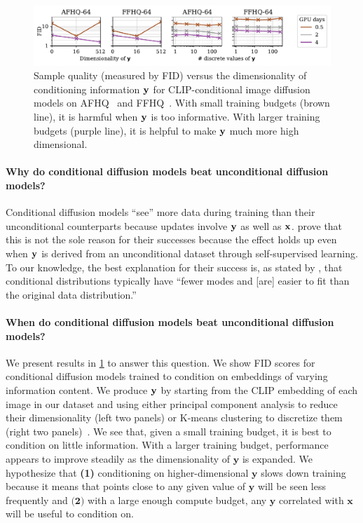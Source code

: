 \begin{figure}[t]
    \centering
    \includegraphics[width=\textwidth]{figs/2sdm/cond-results-vs-nclusters.pdf}
    \caption{Sample quality (measured by FID) versus the dimensionality of conditioning information ${\mathbf{y}}$ for CLIP-conditional image diffusion models on AFHQ~\citep{choi2020stargan} and FFHQ~\citep{karras2018style}. With small training budgets (brown line), it is harmful when ${\mathbf{y}}$ is too informative. With larger training budgets (purple line), it is helpful to make ${\mathbf{y}}$ much more high dimensional.}
    \label{fig:fid-vs-ncomp}
\end{figure}

\paragraph{Why do conditional diffusion models beat unconditional diffusion models?}

Conditional diffusion models ``see'' more data during training than their unconditional counterparts because updates involve ${\mathbf{y}}$ as well as ${\mathbf{x}}$. \citet{bao2022conditional,hu2022self} prove that this is not the sole reason for their successes because the effect holds up even when ${\mathbf{y}}$ is derived from an unconditional dataset through self-supervised learning.
%
To our knowledge, the best explanation for their success is, as stated by \citet{bao2022conditional}, that conditional distributions typically have ``fewer modes and [are] easier to fit than the original data distribution.''

\paragraph{When do conditional diffusion models beat unconditional diffusion models?}
%
We present results in \cref{fig:fid-vs-ncomp} to answer this question. We show FID scores for conditional diffusion models trained to condition on embeddings of varying information content. 
%
We produce ${\mathbf{y}}$ by starting from the CLIP embedding of each image in our dataset and using either principal component analysis to reduce their dimensionality (left two panels) or K-means clustering to discretize them (right two panels)~\citep{hu2022self}.
%
We see that, given a small training budget, it is best to condition on little information. With a larger training budget, performance appears to improve steadily as the dimensionality of $\mathbf{y}$ is expanded. We hypothesize that \textbf{(1)} conditioning on higher-dimensional $\mathbf{y}$ slows down training because it means that points close to any given value of $\mathbf{y}$ will be seen less frequently and $\textbf{(2)}$ with a large enough compute budget, any $\mathbf{y}$ correlated with $\mathbf{x}$ will be useful to condition on.



